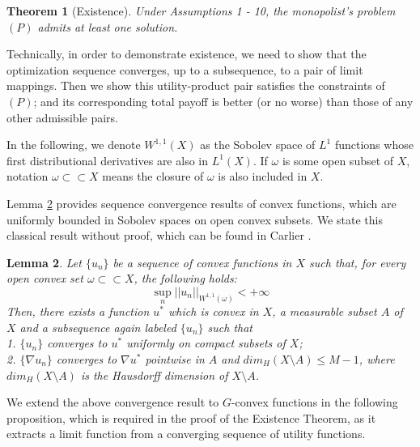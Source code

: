 \documentclass[a4paper, 11pt]{amsart}
\numberwithin{equation}{section}
\theoremstyle{plain}
\newtheorem{theorem}{Theorem}[section]
\newtheorem{lemma}[theorem]{Lemma}
\theoremstyle{definition}
\theoremstyle{remark}
\begin{document}
\begin{theorem}[Existence]
	Under Assumptions 1 - 10, the monopolist's problem $(P)$ admits at least one solution.
\end{theorem}

Technically, in order to demonstrate existence,  we need to show that the optimization sequence converges, up to a subsequence, to a pair of limit mappings. Then we show this utility-product pair satisfies the constraints of $(P)$; and its corresponding total payoff is better (or no worse) than those of any other admissible pairs. \medskip

In the following, we denote $W^{1,1}(X)$ as the Sobolev space of $L^1$ functions whose first distributional derivatives are also in $L^1(X)$. If $\omega$ is some open subset of $X$, notation $\omega \subset \subset X$ means the closure of $\omega$ is also included in $X$.\medskip

Lemma \ref{lemma1} provides sequence convergence results of convex functions, which are uniformly bounded in Sobolev spaces on open convex subsets. We state this classical result without proof, which can be found in Carlier \cite{Carlier01}.\medskip


\begin{lemma}\label{lemma1}
	Let $\{u_n\}$ be a sequence of convex functions in $X$ such that, for every open convex set $\omega \subset \subset X$, the following holds:
	\begin{equation*}
	\sup\limits_{n} ||u_n||_{W^{1,1}(\omega)} < +\infty
	\end{equation*}
	Then, there exists a function $u^*$ %
	which is convex in $X$, a measurable subset $A$ of $X$ and a subsequence again labeled $\{u_n\}$ such that\\
	1. $\{u_n\}$ converges to $u^*$ uniformly on compact subsets of $X$;\\
	2. $\{\nabla u_n\}$ converges to $\nabla u^*$ pointwise in $A$ and $dim_{H}(X\setminus A)\le M-1$, where $dim_{H}(X\setminus A)$ is the Hausdorff dimension of $X\setminus A$.
\end{lemma}

{We extend the above convergence result to $G$-convex functions in the following proposition, which is required in the proof of the Existence Theorem, as it extracts a limit function from a converging sequence of utility functions.}
\end{document}
